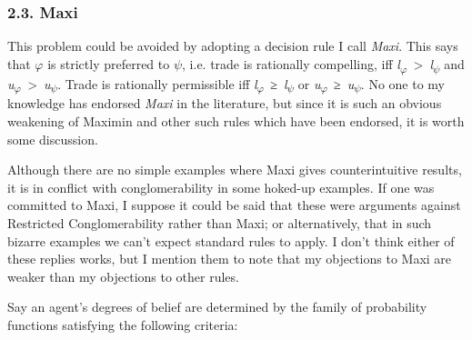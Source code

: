 \hypertarget{maxi}{%
\subsubsection{2.3. Maxi}\label{maxi}}

This problem could be avoided by adopting a decision rule I call
\emph{Maxi}. This says that $\varphi$ is strictly preferred to $\psi$, i.e. trade is
rationally compelling, iff
\emph{l}\textsubscript{$\varphi$}~\textgreater{}~\emph{l}\textsubscript{$\psi$} and
\emph{u}\textsubscript{$\varphi$}~\textgreater{}~\emph{u}\textsubscript{$\psi$}.
Trade is rationally permissible iff
\emph{l}\textsubscript{$\varphi$}~≥~\emph{l}\textsubscript{$\psi$} or
\emph{u}\textsubscript{$\varphi$}~≥~\emph{u}\textsubscript{$\psi$}. No one to my
knowledge has endorsed \emph{Maxi} in the literature, but since it is
such an obvious weakening of Maximin and other such rules which have
been endorsed, it is worth some discussion.

Although there are no simple examples where Maxi gives counterintuitive
results, it is in conflict with conglomerability in some hoked-up
examples. If one was committed to Maxi, I suppose it could be said that
these were arguments against Restricted Conglomerability rather than
Maxi; or alternatively, that in such bizarre examples we can't expect
standard rules to apply. I don't think either of these replies works,
but I mention them to note that my objections to Maxi are weaker than my
objections to other rules.

Say an agent's degrees of belief are determined by the family of
probability functions satisfying the following criteria:


